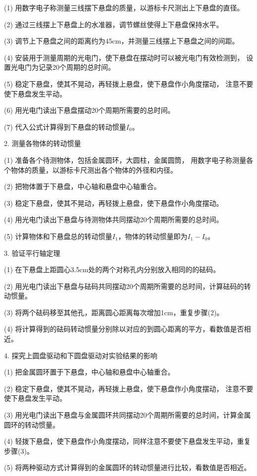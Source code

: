 \documentclass[12pt,hyperref,a4paper,UTF8]{ctexart}
\begin{document}
(1) 用数字电子称测量三线摆下悬盘的质量，以游标卡尺测出上下悬盘的直径。

(2) 通过三线摆上下悬盘上的水准器，调节螺丝使得上下悬盘保持水平。

(3) 调节上下悬盘之间的距离约为45cm，并测量三线摆上下悬盘之间的间距。

(4) 安装用于测量周期的光电门，使下悬盘在摆动时可以被光电门有效检测到，
设置光电门为记录20个周期的总时间。

(5) 稳定下悬盘，使其不晃动，再轻拨上悬盘，使下悬盘作小角度摆动，
注意不要使下悬盘发生平动。

(6) 用光电门读出下悬盘摆动20个周期所需要的总时间。

(7) 代入公式计算得到下悬盘的转动惯量$ I_0 $。

2. 测量各物体的转动惯量

(1) 准备各个待测物体，包括金属圆环，大圆柱，金属圆筒，
用数字电子称测量各个物体的质量，以游标卡尺测出各个物体的外径和内径。

(2) 把物体置于下悬盘，中心轴和悬盘中心轴重合。

(3) 稳定下悬盘，使其不晃动，再轻拨上悬盘，使下悬盘作小角度摆动。

(4) 用光电门读出下悬盘与待测物体共同摆动20个周期所需要的总时间。

(5) 计算物体和下悬盘总的转动惯量$ I_1 $，物体的转动惯量即为$ I_1 - I_0 $。

3. 验证平行轴定理

(1) 在下悬盘上距圆心3.5cm处的两个对称孔内分别放入相同的的砝码。

(2) 用光电门读出下悬盘与砝码共同摆动20个周期所需要的总时间，计算砝码的转动惯量。

(3) 将两个砝码移至其他孔，距离圆心距离每次增加1cm，重复步骤(2)。

(4) 将计算得到的砝码转动惯量分别除以对应的到圆心距离的平方，看数值是否相近。

4. 探究上圆盘驱动和下圆盘驱动对实验结果的影响

(1) 把金属圆环置于下悬盘，中心轴和悬盘中心轴重合。

(2) 稳定下悬盘，使其不晃动，再轻拨上悬盘，使下悬盘作小角度摆动，
注意不要使下悬盘发生平动。

(3) 用光电门读出下悬盘与金属圆环共同摆动20个周期所需要的总时间，计算金属圆环的转动惯量。

(4) 轻拨下悬盘，使下悬盘作小角度摆动，同样注意不要使下悬盘发生平动，重复步骤(3)。

(5) 将两种驱动方式计算得到的金属圆环的转动惯量进行比较，看数值是否相近。
\end{document}

